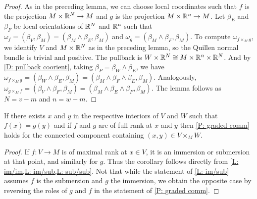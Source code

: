 \begin{proof}
	As in the preceding lemma, we can choose local coordinates such that $f$ is the projection $M\times \mathbb{R}^N\to M$ and $g$ is the projection $M\times \mathbb{R}^n\to M$.
	Let $\beta_E$ and $\beta_F$ be local orientations of $\mathbb{R}^N$ and $\mathbb{R}^n$ such that $\omega_f=(\beta_V,\beta_M)=(\beta_M\wedge \beta_E,\beta_M)$ and $\omega_g=(\beta_M\wedge \beta_F,\beta_M)$.
	To compute $\omega_{f\times_Mg}$, we identify $V$ and $M\times \mathbb{R}^N$ as in the preceding lemma, so the Quillen normal bundle is trivial and positive.
	The pullback is $W\times \mathbb{R}^N\cong M\times \mathbb{R}^n\times \mathbb{R}^N$.
	And by \cref{D: pullback coorient}, taking $\beta_P=\beta_W\wedge \beta_E$, we have $\omega_{f\times_Mg}=(\beta_W\wedge \beta_E,\beta_M)=(\beta_M\wedge \beta_F\wedge \beta_E,\beta_M)$.
	Analogously, $\omega_{g\times_Mf}=(\beta_V\wedge \beta_F,\beta_M)=(\beta_M\wedge \beta_E\wedge \beta_F,\beta_M)$.
	The lemma follows as $N=v-m$ and $n=w-m$.
\end{proof}

\begin{corollary}\label{C: if full}
	If there exists $x$ and $y$ in the respective interiors of $V$ and $W$ such that $f(x)=g(y)$ and if $f$ and $g$ are of full rank at $x$ and $y$ then \cref{P: graded comm} holds for the connected component containing $(x,y)\in V\times_MW$.
\end{corollary}

\begin{proof}
	If $f \colon V \to M$ is of maximal rank at $x\in V$, it is an immersion or submersion at that point, and similarly for $g$.
	Thus the corollary follows directly from \cref{L: im/im,L: im/sub,L: sub/sub}.
	Not that while the statement of \cref{L: im/sub} assumes $f$ is the submersion and $g$ the immersion, we obtain the opposite case by reversing the roles of $g$ and $f$ in the statement of \cref{P: graded comm}.
\end{proof}

\begin{comment}
	If they are both immersions, apply Lemma \ref{L: im/im}.
	If $f$ is a submersion, it is also a submersion in a neighborhood of $U$ and so it is a submersion on a neighborhood $U$ of $x$.
	Let $A$ be the intersection of $U$ with the interior of $V$.
	By the transversality of $f$ and $g$, if $g(y)=f(x)$, there must be points in a neighborhood of $B$ of $y$ in $W$ that map to $f(A)$, and as a map is a submersion or immersion on an open set, there is a $y'$ in the interior of $B$ that maps to $f(A)$.
	Taking $x'$ in $f^{-1}(y')$, if $g$ is an immersion we apply Lemma \ref{L: im/sub} to $x', y'$, and if $g$ is a submersion we apply Lemma \ref{L: sub/sub}.
	If $f$ is an immersion and $g$ a submersion, we reverse the roles in the argument.
\end{comment}

